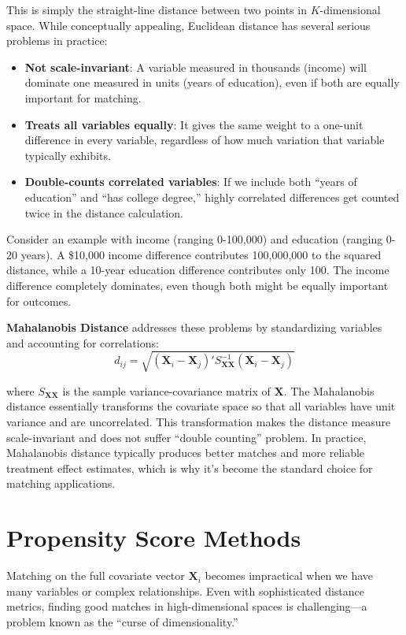 \documentclass[12pt]{article}
\begin{document}
\begin{multicols}{2}
This is simply the straight-line distance between two points in $K$-dimensional space.
While conceptually appealing, Euclidean distance has several serious problems in practice:

\begin{itemize}
  \item \textbf{Not scale-invariant}: A variable measured in thousands (income) will dominate one measured in units (years of education), even if both are equally important for matching.
  
  \item \textbf{Treats all variables equally}: It gives the same weight to a one-unit difference in every variable, regardless of how much variation that variable typically exhibits.
  
  \item \textbf{Double-counts correlated variables}: If we include both ``years of education'' and ``has college degree,'' highly correlated differences get counted twice in the distance calculation.
\end{itemize}

Consider an example with income (ranging 0-100,000) and education (ranging 0-20 years).
A \$10,000 income difference contributes 100,000,000 to the squared distance, while a 10-year education difference contributes only 100.
The income difference completely dominates, even though both might be equally important for outcomes.

\textbf{Mahalanobis Distance} addresses these problems by standardizing variables and accounting for correlations:
$$d_{ij} = \sqrt{(\bm{X}_i - \bm{X}_j)' S_{\bm{X}\bm{X}}^{-1} (\bm{X}_i - \bm{X}_j)}$$

where $S_{\bm{X}\bm{X}}$ is the sample variance-covariance matrix of $\bm{X}$.
The Mahalanobis distance essentially transforms the covariate space so that all variables have unit variance and are uncorrelated.
This transformation makes the distance measure scale-invariant and does not suffer ``double counting'' problem.
In practice, Mahalanobis distance typically produces better matches and more reliable treatment effect estimates, which is why it's become the standard choice for matching applications.



\section*{Propensity Score Methods}

Matching on the full covariate vector $\bm{X}_i$ becomes impractical when we have many variables or complex relationships.
Even with sophisticated distance metrics, finding good matches in high-dimensional spaces is challenging---a problem known as the ``curse of dimensionality.''


\end{multicols}
\end{document}
